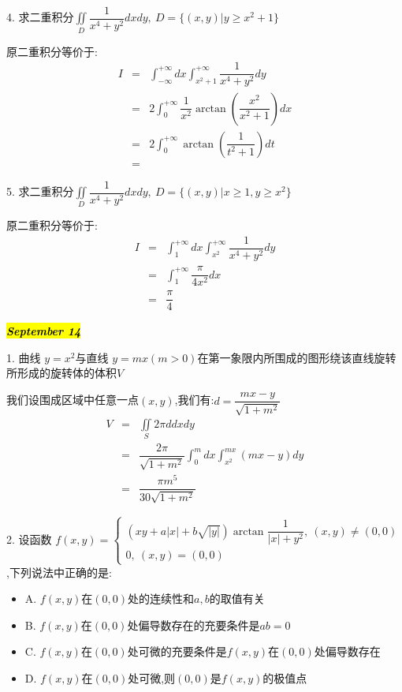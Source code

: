 4. 求二重积分$\iint\limits_{D}\dfrac{1}{x^4+y^2}dxdy,\ D=\{(x,y)|y\geq x^2+1\}$
\begin{solution}

	原二重积分等价于:
	\begin{eqnarray*}
		I&=&\int_{-\infty}^{+\infty}dx\int_{x^2+1}^{+\infty}\dfrac{1}{x^4+y^2}dy\\
		&=&2\int_{0}^{+\infty}\dfrac{1}{x^2}\arctan(\dfrac{x^2}{x^2+1})dx\\
		&=&2\int_{0}^{+\infty}\arctan(\dfrac{1}{t^2+1})dt\\
		&=&
	\end{eqnarray*}
\end{solution}

5. 求二重积分$\iint\limits_{D}\dfrac{1}{x^4+y^2}dxdy,\ D=\{(x,y)|x\geq 1,y\geq x^2\}$
\begin{solution}

	原二重积分等价于:
	\begin{eqnarray*}
		I&=&\int_{1}^{+\infty}dx\int_{x^2}^{+\infty}\dfrac{1}{x^4+y^2}dy\\
		&=&\int_{1}^{+\infty}\dfrac{\pi}{4x^2}dx\\
		&=&\dfrac{\pi}{4}
	\end{eqnarray*}
\end{solution}

\hl{\textbf{\textit{September 14}}}

1. 曲线 $y=x^2$与直线 $y=mx(m>0)$在第一象限内所围成的图形绕该直线旋转所形成的旋转体的体积$V$
\begin{solution}

	我们设围成区域中任意一点$(x,y)$,我们有:$d=\dfrac{mx-y}{\sqrt{1+m^2}}$
	\begin{eqnarray*}
		V&=&\iint\limits_{S}2\pi ddxdy\\
		&=&\dfrac{2\pi}{\sqrt{1+m^2}}\int_{0}^{m}dx\int_{x^2}^{mx}(mx-y)dy\\
		&=&\dfrac{\pi m^5}{30\sqrt{1+m^2}}
	\end{eqnarray*}
\end{solution}

2. 设函数 $f(x,y)=\left\lbrace 
\begin{array}{l}
	(xy+a|x|+b\sqrt{|y|})\arctan \dfrac{1}{|x|+y^2},\ (x,y)\neq (0,0)\\
	0,\ (x,y)=(0,0)
\end{array}
\right. $,下列说法中正确的是:  
\begin{itemize}
	\item A. $f(x,y)$在$(0,0)$处的连续性和$a,b$的取值有关
	\item B. $f(x,y)$在$(0,0)$处偏导数存在的充要条件是$ab=0$
	\item C. $f(x,y)$在$(0,0)$处可微的充要条件是$f(x,y)$在$(0,0)$处偏导数存在
	\item D. $f(x,y)$在$(0,0)$处可微,则$(0,0)$是$f(x,y)$的极值点
\end{itemize}
\begin{solution}
	
\end{solution}

